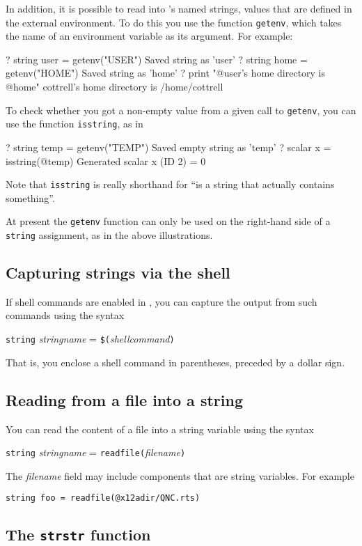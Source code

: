 In addition, it is possible to read into 's named strings,
values that are defined in the external environment.  To do this you
use the function \texttt{getenv}, which takes the name of an environment
variable as its argument.  For example:
%
\begin{code}
? string user = getenv("USER")
Saved string as 'user'
? string home = getenv("HOME")
Saved string as 'home'
? print "@user's home directory is @home"
cottrell's home directory is /home/cottrell
\end{code}
%
To check whether you got a non-empty value from a given call to
\texttt{getenv}, you can use the function \texttt{isstring}, as in
%
\begin{code}
? string temp = getenv("TEMP")
Saved empty string as 'temp'
? scalar x = isstring(@temp)
Generated scalar x (ID 2) = 0
\end{code}
%
Note that \texttt{isstring} is really shorthand for ``is a string that
actually contains something''.  

At present the \texttt{getenv} function can only be used on the
right-hand side of a \texttt{string} assignment, as in the above
illustrations.

\subsection{Capturing strings via the shell}

If shell commands are enabled in , you can capture the
output from such commands using the syntax 

\texttt{string} \textsl{stringname} = \texttt{\$(}\textsl{shellcommand}\texttt{)}

That is, you enclose a shell command in parentheses, preceded by
a dollar sign.

\subsection{Reading from a file into a string}

You can read the content of a file into a string variable using
the syntax

\texttt{string} \textsl{stringname} = \texttt{readfile(}\textsl{filename}\texttt{)}

The \textsl{filename} field may include components that are
string variables.  For example

\verb|string foo = readfile(@x12adir/QNC.rts)|

\subsection{The \texttt{strstr} function}

